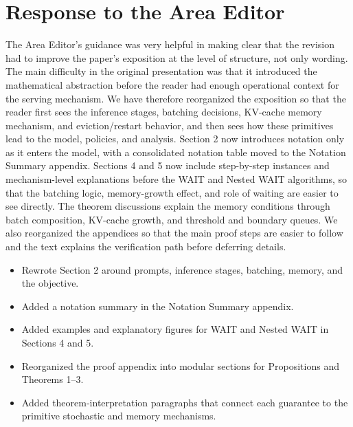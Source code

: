 \section*{Response to the Area Editor}


\response The Area Editor's guidance was very helpful in making clear that the revision had to improve the paper's exposition at the level of structure, not only wording. The main difficulty in the original presentation was that it introduced the mathematical abstraction before the reader had enough operational context for the serving mechanism. We have therefore reorganized the exposition so that the reader first sees the inference stages, batching decisions, KV-cache memory mechanism, and eviction/restart behavior, and then sees how these primitives lead to the model, policies, and analysis. Section 2 now introduces notation only as it enters the model, with a consolidated notation table moved to the Notation Summary appendix. Sections 4 and 5 now include step-by-step instances and mechanism-level explanations before the WAIT and Nested WAIT algorithms, so that the batching logic, memory-growth effect, and role of waiting are easier to see directly. The theorem discussions explain the memory conditions through batch composition, KV-cache growth, and threshold and boundary queues. We also reorganized the appendices so that the main proof steps are easier to follow and the text explains the verification path before deferring details.

\changes
\begin{itemize}
    \item Rewrote Section 2 around prompts, inference stages, batching, memory, and the objective.
    \item Added a notation summary in the Notation Summary appendix.
    \item Added examples and explanatory figures for WAIT and Nested WAIT in Sections 4 and 5.
    \item Reorganized the proof appendix into modular sections for Propositions and Theorems 1--3.
    \item Added theorem-interpretation paragraphs that connect each guarantee to the primitive stochastic and memory mechanisms.
\end{itemize}

